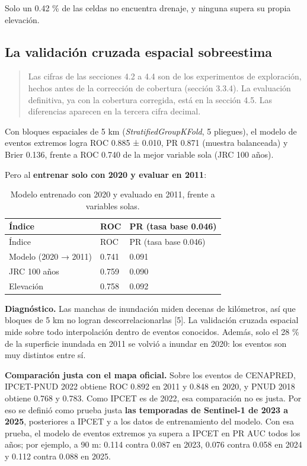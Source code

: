 Solo un 0.42 \% de las celdas no encuentra drenaje, y ninguna supera su propia elevación.

\subsection{La validación cruzada espacial sobreestima}

\begin{quote}
Las cifras de las secciones 4.2 a 4.4 son de los experimentos de exploración, hechos antes de la corrección de cobertura (sección 3.3.4). La evaluación definitiva, ya con la cobertura corregida, está en la sección 4.5. Las diferencias aparecen en la tercera cifra decimal.
\end{quote}

Con bloques espaciales de 5 km (\emph{StratifiedGroupKFold}, 5 pliegues), el modelo de eventos extremos logra ROC 0.885 ± 0.010, PR 0.871 (muestra balanceada) y Brier 0.136, frente a ROC 0.740 de la mejor variable sola (JRC 100 años).

Pero al \textbf{entrenar solo con 2020 y evaluar en 2011}:

\begin{longtable}[]{@{}lll@{}}
\caption{Modelo entrenado con 2020 y evaluado en 2011, frente a variables solas.}\tabularnewline
\toprule\noalign{}
Índice & ROC & PR (tasa base 0.046) \\
\midrule\noalign{}
\endfirsthead
\toprule\noalign{}
Índice & ROC & PR (tasa base 0.046) \\
\midrule\noalign{}
\endhead
\bottomrule\noalign{}
\endlastfoot
Modelo (2020 → 2011) & 0.741 & 0.091 \\
JRC 100 años & 0.759 & 0.090 \\
Elevación & 0.758 & 0.092 \\
\end{longtable}

\textbf{Diagnóstico.} Las manchas de inundación miden decenas de kilómetros, así que bloques de 5 km no logran descorrelacionarlas {[}5{]}. La validación cruzada espacial mide sobre todo interpolación dentro de eventos conocidos. Además, solo el 28 \% de la superficie inundada en 2011 se volvió a inundar en 2020: los eventos son muy distintos entre sí.

\textbf{Comparación justa con el mapa oficial.} Sobre los eventos de CENAPRED, IPCET-PNUD 2022 obtiene ROC 0.892 en 2011 y 0.848 en 2020, y PNUD 2018 obtiene 0.768 y 0.783. Como IPCET es de 2022, esa comparación no es justa. Por eso se definió como prueba justa \textbf{las temporadas de Sentinel-1 de 2023 a 2025}, posteriores a IPCET y a los datos de entrenamiento del modelo. Con esa prueba, el modelo de eventos extremos ya supera a IPCET en PR AUC todos los años; por ejemplo, a 90 m: 0.114 contra 0.087 en 2023, 0.076 contra 0.058 en 2024 y 0.112 contra 0.088 en 2025.

